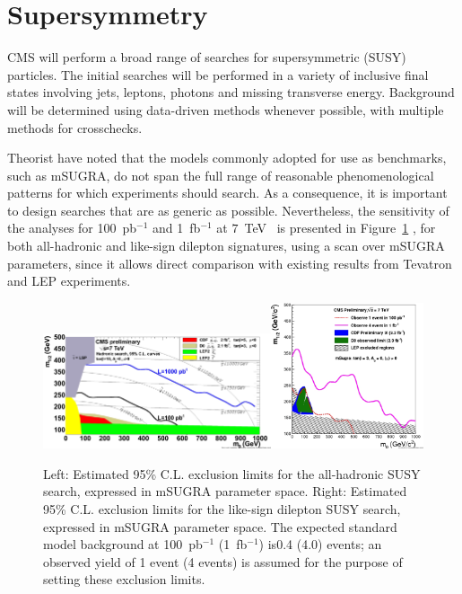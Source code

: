 \documentclass{PoS}
\begin{document}
\section{Supersymmetry}
CMS will perform a broad range of searches for supersymmetric (SUSY) particles. The initial searches
will be performed in a variety of inclusive final states involving jets, leptons, photons and missing 
transverse energy. Background will be determined using data-driven  methods whenever possible, with multiple 
methods for crosschecks. 

Theorist have noted that the models commonly adopted for use as benchmarks, such as mSUGRA, 
do not span the full range of reasonable phenomenological patterns for which experiments should search.
As a consequence, it is important to design searches that are as generic as possible.
Nevertheless, the sensitivity of the analyses for 100~pb$^{-1}$ and 1~fb$^{-1}$ 
at $7$~TeV~\cite{CMSPhysicsReach7TeV} is presented in Figure~\ref{fig:SUSY} 
, for both all-hadronic and like-sign dilepton signatures, using a scan over mSUGRA parameters,  
since it allows direct comparison with existing results from Tevatron and LEP experiments.

\begin{figure}[htbp] 
\centering
\includegraphics[width=0.6\textwidth]{SUSY_Fig1.eps}\includegraphics[width=0.4\textwidth]{SUSY_Fig2.eps}  
\caption{Left: Estimated 95\% C.L. exclusion limits for the all-hadronic SUSY search, expressed in mSUGRA 
parameter space. Right: Estimated 95\% C.L. exclusion limits for the like-sign dilepton SUSY search, 
expressed in mSUGRA parameter space. The expected standard model background at 100~pb$^{-1}$ (1~fb$^{-1}$) 
is0.4 (4.0) events; an observed yield of 1 event (4 events) is assumed for the purpose of setting these exclusion limits.}
\label{fig:SUSY}
\end{figure}
\end{document}
